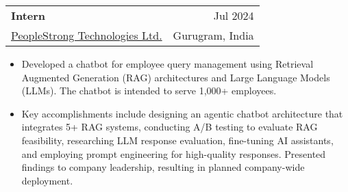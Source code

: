 \documentclass[letterpaper,10pt]{article}
\makeatletter
\newcommand\indentsize{10pt}
\newcommand{\resumeItem}[1]{
  \item\small{
    {#1 \vspace{-2pt}}
  }
}
\newcommand{\resumeSubheading}[4]{
    \item\vspace{-2pt}
    \begin{tabular*}{0.97\textwidth}[t]{l@{\extracolsep{\fill}}r}
      \textbf{#1} & #2 \\
      #3 & #4 \\
    \end{tabular*}%
}
\newcommand{\resumeItemListStart}{\begin{itemize}[leftmargin=\indentsize, label=-]\vspace{-7pt}}
\newcommand{\resumeItemListEnd}{\end{itemize}\vspace{-5pt}}
\makeatother
\begin{document}
    \resumeSubheading{Intern}{Jul 2024}{\href{https://www.peoplestrong.com/about-us/}{PeopleStrong Technologies Ltd.}}{Gurugram, India}
        \resumeItemListStart
            \resumeItem{Developed a chatbot for employee query management using Retrieval Augmented Generation (RAG) architectures and Large Language Models (LLMs). The chatbot is intended to serve 1,000+ employees.}
            \resumeItem{Key accomplishments include designing an agentic chatbot architecture that integrates 5+ RAG systems, conducting A/B testing to evaluate RAG feasibility, researching LLM response evaluation, fine-tuning AI assistants, and employing prompt engineering for high-quality responses. Presented findings to company leadership, resulting in planned company-wide deployment.}
        \resumeItemListEnd
    
    
    
\end{document}
